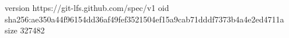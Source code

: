 version https://git-lfs.github.com/spec/v1
oid sha256:ae350a44f96154dd36af49fef3521504ef15a9cab71dddf7373b4a4e2ed4711a
size 327482
